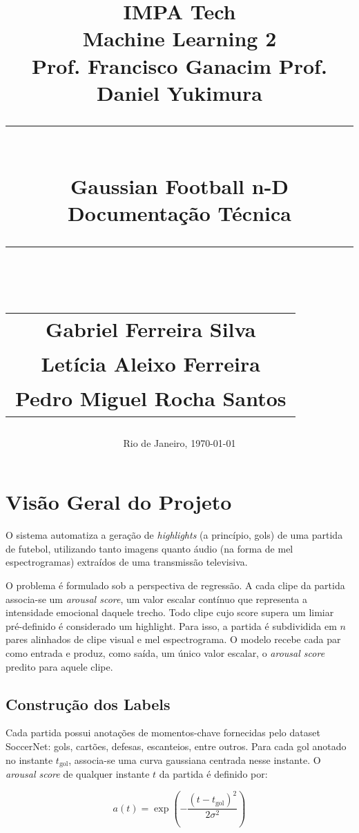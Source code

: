 \documentclass[12pt, a4paper]{article}
\title{
    \vspace{-2cm}
    \Large \textbf{IMPA Tech} \\[0.5cm]
    \large Machine Learning 2 \\
    \small Prof. Francisco Ganacim \quad Prof. Daniel Yukimura \\[1.5cm]
    \rule{\linewidth}{0.5pt} \\[0.4cm]
    {\Huge \textbf{Gaussian Football n-D}} \\[0.2cm]
    \large Documentação Técnica \\
    \rule{\linewidth}{0.5pt} \\[1.5cm]
    \normalsize
    \begin{tabular}{c}
        Gabriel Ferreira Silva \\[0.3cm]
        Letícia Aleixo Ferreira \\[0.3cm]
        Pedro Miguel Rocha Santos
    \end{tabular}
}
\date{\vspace{1cm} Rio de Janeiro, \today}
\begin{document}
\maketitle
\thispagestyle{empty}
\newpage

\tableofcontents
\newpage


\section{Visão Geral do Projeto}
\label{sec:visao_geral}

O sistema automatiza a geração de \textit{highlights} (a princípio, gols) de uma partida de futebol, utilizando tanto imagens quanto áudio (na forma de mel espectrogramas) extraídos de uma transmissão televisiva.

O problema é formulado sob a perspectiva de regressão. A cada clipe da partida associa-se um \textit{arousal score}, um valor escalar contínuo que representa a intensidade emocional daquele trecho. Todo clipe cujo score supera um limiar pré-definido é considerado um highlight. Para isso, a partida é subdividida em $n$ pares alinhados de clipe visual e mel espectrograma. O modelo recebe cada par como entrada e produz, como saída, um único valor escalar, o \textit{arousal score} predito para aquele clipe.

\subsection{Construção dos Labels}

Cada partida possui anotações de momentos-chave fornecidas pelo dataset SoccerNet: gols, cartões, defesas, escanteios, entre outros. Para cada gol anotado no instante $t_{\text{gol}}$, associa-se uma curva gaussiana centrada nesse instante. O \textit{arousal score} de qualquer instante $t$ da partida é definido por:

\begin{equation}
    a(t) = \exp\left(-\frac{(t - t_{\text{gol}})^2}{2\sigma^2}\right)
    \label{eq:arousal}
\end{equation}
\end{document}
